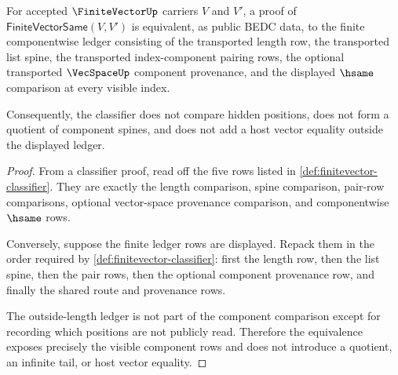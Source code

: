 \begin{theorem}
\label{thm:finitevector-componentwise-ledger-exactness}
For accepted $\FiniteVectorUp$ carriers $V$ and $V'$, a proof of $\mathsf{FiniteVectorSame}(V,V')$ is equivalent, as public BEDC data, to the finite componentwise ledger consisting of the transported length row, the transported list spine, the transported index-component pairing rows, the optional transported $\VecSpaceUp$ component provenance, and the displayed $\hsame$ comparison at every visible index.

Consequently, the classifier does not compare hidden positions, does not form a quotient of component spines, and does not add a host vector equality outside the displayed ledger.
\end{theorem}
\begin{proof}
From a classifier proof, read off the five rows listed in \autoref{def:finitevector-classifier}. They are exactly the length comparison, spine comparison, pair-row comparisons, optional vector-space provenance comparison, and componentwise $\hsame$ rows.

Conversely, suppose the finite ledger rows are displayed. Repack them in the order required by \autoref{def:finitevector-classifier}: first the length row, then the list spine, then the pair rows, then the optional component provenance row, and finally the shared route and provenance rows.

The outside-length ledger is not part of the component comparison except for recording which positions are not publicly read. Therefore the equivalence exposes precisely the visible component rows and does not introduce a quotient, an infinite tail, or host vector equality.
\end{proof}

